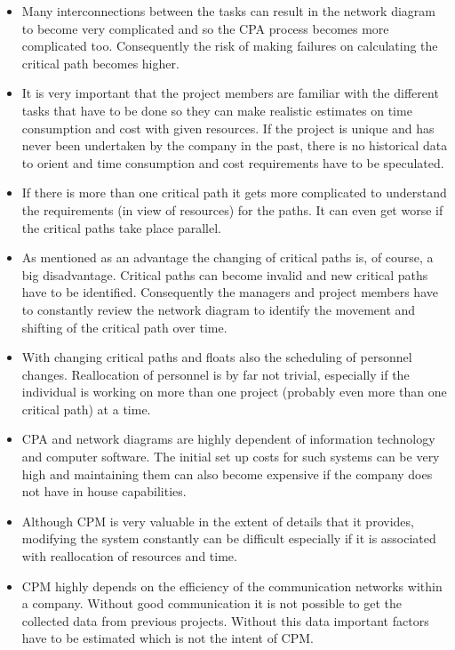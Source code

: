 \begin{itemize}
\item Many interconnections between the tasks can result in the network diagram to become very complicated
and so the CPA process becomes more complicated too. Consequently the risk of making failures on
calculating the critical path becomes higher.

\item It is very important that the project members are familiar with the different tasks that have to be
done so they can make realistic estimates on time consumption and cost with given resources. If the
project is unique and has never been undertaken by the company in the past, there is no historical
data to orient and time consumption and cost requirements have to be speculated.

\item If there is more than one critical path it gets more complicated to understand the requirements (in
view of resources) for the paths. It can even get worse if the critical paths take place parallel.

\item As mentioned as an advantage the changing of critical paths is, of course, a big disadvantage.
Critical paths can become invalid and new critical paths have to be identified. Consequently the
managers and project members have to constantly review the network diagram to identify the movement
and shifting of the critical path over time.

\item With changing critical paths and floats also the scheduling of personnel changes. Reallocation of
personnel is by far not trivial, especially if the individual is working on more than one project
(probably even more than one critical path) at a time.

\item CPA and network diagrams are highly dependent of information technology and computer software. The
initial set up costs for such systems can be very high and maintaining them can also become
expensive if the company does not have in house capabilities.

\item Although CPM is very valuable in the extent of details that it provides, modifying the system
constantly can be difficult especially if it is associated with reallocation of resources and time.

\item CPM highly depends on the efficiency of the communication networks within a company. Without good
communication it is not possible to get the collected data from previous projects. Without this data
important factors have to be estimated which is not the intent of CPM.


\end{itemize}
